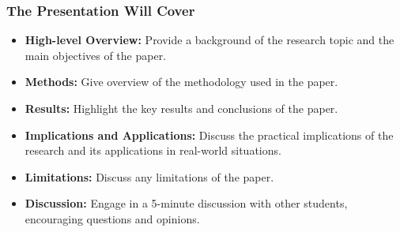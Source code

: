 \begin{frame}
\frametitle{The Presentation Will Cover}
    \begin{itemize}
        \item \textbf{High-level Overview:} Provide a background of the research topic and the main objectives of the paper.
        \item \textbf{Methods:} Give overview of the methodology used in the paper.
        \item \textbf{Results:} Highlight the key results and  conclusions of the paper.
        \item \textbf{Implications and Applications:} Discuss the practical implications of the research and its applications in real-world situations.
        \item \textbf{Limitations:} Discuss any limitations of the paper.
        \item \textbf{Discussion:} Engage in a 5-minute discussion with other students, encouraging questions and opinions.
    \end{itemize}
\end{frame}

